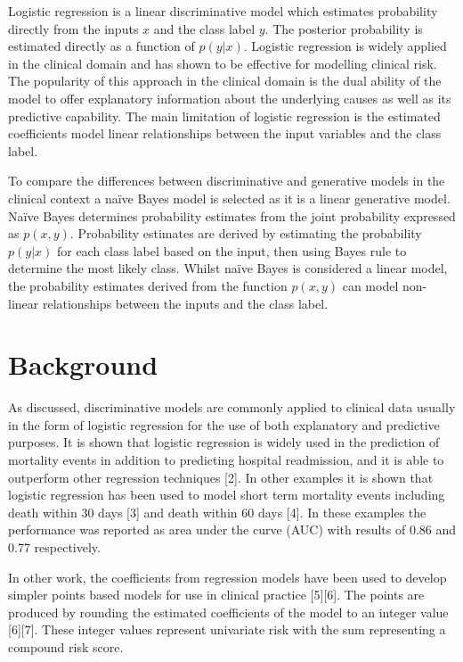 \documentclass[a4paper,UKenglish]{oasics-v2016}
\begin{document}
Logistic regression is a linear discriminative model which estimates probability directly from the inputs $x$ and the class label $y$. The posterior probability is estimated directly as a function of $p(y|x)$. Logistic regression is widely applied in the clinical domain and has shown to be effective for modelling clinical risk. The popularity of this approach in the clinical domain is the dual ability of the model to offer explanatory information about the underlying causes as well as its predictive capability. The main limitation of logistic regression is the estimated coefficients model linear relationships between the input variables and the class label.

To compare the differences between discriminative and generative models in the clinical context a naïve Bayes model is selected as it is a linear generative model. Naïve Bayes determines probability estimates from the joint probability expressed as $p(x,y)$. Probability estimates are derived by estimating the probability $p(y|x)$ for each class label based on the input, then using Bayes rule to determine the most likely class. Whilst naïve Bayes is considered a linear model, the probability estimates derived from the function $p(x,y)$ can model non-linear relationships between the inputs and the class label.


\section{Background}
As discussed, discriminative models are commonly applied to clinical data usually in the form of logistic regression for the use of both explanatory and predictive purposes. It is shown that logistic regression is widely used in the prediction of mortality events in addition to predicting hospital readmission, and it is able to outperform other regression techniques [2]. In other examples it is shown that logistic regression has been used to model short term mortality events including death within 30 days [3] and death within 60 days [4]. In these examples the performance was reported as area under the curve (AUC) with results of 0.86 and 0.77 respectively.

In other work, the coefficients from regression models have been used to develop simpler points based models for use in clinical practice [5][6]. The points are produced by rounding the estimated coefficients of the model to an integer value [6][7]. These integer values represent univariate risk with the sum representing a compound risk score.
\end{document}
